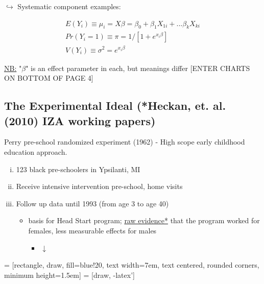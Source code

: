\noindent $\hookrightarrow$ Systematic component examples:

\begin{eqnarray} 
E(Y_{i})\equiv \mu_{i} = X\beta = \beta_{0} + \beta_{1}X_{1i} + ... \beta_{k}X_{ki} \\
Pr(Y_{i}=1) \equiv \pi = 1/[1+e^{x_{i}\beta}] \\
V(Y_{i}) \equiv \sigma^{2} = e^{x_{i}\beta} 
\end{eqnarray}

\noindent \underline{NB:} "$\beta$" is an effect parameter in each, but meanings differ
[ENTER CHARTS ON BOTTOM OF PAGE 4]


\subsection{The Experimental Ideal (*Heckan, et. al. (2010) IZA working papers)}

Perry pre-school randomized experiment (1962) - High scope early childhood education approach.
\begin{enumerate}[(i)]
\item 123 black pre-schoolers in Ypsilanti, MI
\item Receive intensive intervention pre-school, home visits
\item Follow up data until 1993 (from age 3 to age 40)
    \begin{itemize}
    \item basis for Head Start program; \underline{raw evidence*} that the program worked for females, less measurable effects for males
        \begin{itemize}
        \item $\downarrow$
        \end{itemize}
    \end{itemize}
\end{enumerate}
         = [rectangle, draw, fill=blue!20, 
        text width=7em, text centered, rounded corners, minimum height=1.5em]
         = [draw, -latex']
        \qquad \qquad \qquad

